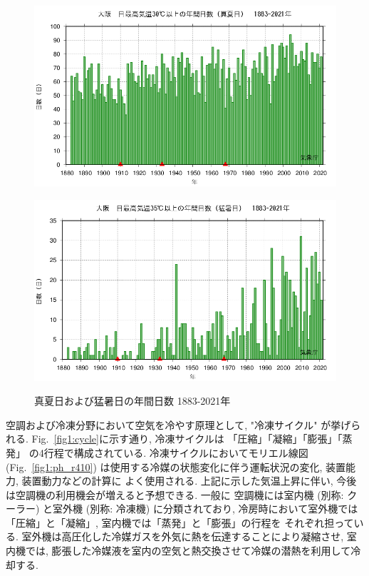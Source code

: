 \documentclass[a4j,fleqn,dvipdfmx,uplatex]{jsarticle}
\newcommand{\figref}[1]{Fig.\ \ref{#1}}
\begin{document}
\begin{figure}[tb]
  \centering
  \begin{minipage}[b]{0.45\linewidth}
      \centering
      \includegraphics[width=\linewidth]{img/27_OSAKA_tmaxGE30_2021.png}
      \label{subfig1:temp_osaka}
    \end{minipage}
    \begin{minipage}[b]{0.45\linewidth}
      \centering
      \includegraphics[width=\linewidth]{img/27_OSAKA_tmaxGE35_2021.png}
      \label{subfig1:temp_osaka2}
    \end{minipage}
    \caption{真夏日および猛暑日の年間日数 1883-2021年\cite{temp_osaka3}}
    \label{fig1:temp_osaka}
\end{figure}
 

空調および冷凍分野において空気を冷やす原理として, "冷凍サイクル" が挙げられる. 
\figref{fig1:cycle}に示す通り, 冷凍サイクルは 「圧縮」「凝縮」「膨張」「蒸発」 
の4行程で構成されている. 冷凍サイクルにおいてモリエル線図(\figref{fig1:ph_r410}) 
は使用する冷媒の状態変化に伴う運転状況の変化, 装置能力, 装置動力などの計算に
よく使用される. 
上記に示した気温上昇に伴い, 今後は空調機の利用機会が増えると予想できる. 一般に
空調機には室内機 (別称: クーラー) と室外機 (別称: 冷凍機) に分類されており, 
冷房時において室外機では「圧縮」と「凝縮」, 室内機では「蒸発」と「膨張」の行程を
それぞれ担っている. 室外機は高圧化した冷媒ガスを外気に熱を伝達することにより凝縮させ, 
室内機では, 膨張した冷媒液を室内の空気と熱交換させて冷媒の潜熱を利用して冷却する. 
\end{document}
